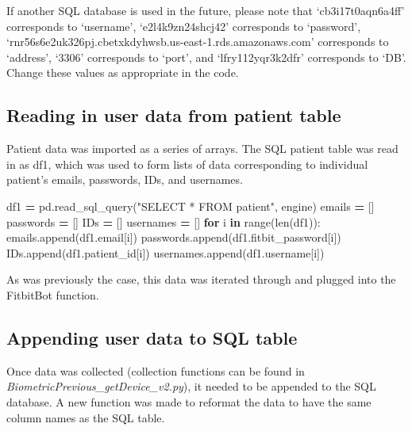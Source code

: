 \documentclass[]{book}
\newenvironment{Shaded}{\begin{snugshade}}{\end{snugshade}}
\newcommand{\BuiltInTok}[1]{#1}
\newcommand{\ControlFlowTok}[1]{\textcolor[rgb]{0.13,0.29,0.53}{\textbf{#1}}}
\newcommand{\KeywordTok}[1]{\textcolor[rgb]{0.13,0.29,0.53}{\textbf{#1}}}
\newcommand{\NormalTok}[1]{#1}
\newcommand{\OperatorTok}[1]{\textcolor[rgb]{0.81,0.36,0.00}{\textbf{#1}}}
\newcommand{\StringTok}[1]{\textcolor[rgb]{0.31,0.60,0.02}{#1}}
\begin{document}
If another SQL database is used in the future, please note that `cb3i17t0aqn6a4ff' corresponds to `username', `e2l4k9zn24shcj42' corresponds to `password', `rnr56s6e2uk326pj.cbetxkdyhwsb.us-east-1.rds.amazonaws.com' corresponds to `address', `3306' corresponds to `port', and `lfry112yqr3k2dfr' corresponds to `DB'. Change these values as appropriate in the code.

\hypertarget{reading-in-user-data-from-patient-table}{%
\subsection{Reading in user data from patient table}\label{reading-in-user-data-from-patient-table}}

Patient data was imported as a series of arrays. The SQL patient table was read in as df1, which was used to form lists of data corresponding to individual patient's emails, passwords, IDs, and usernames.

\begin{Shaded}
\begin{Highlighting}[]
\NormalTok{df1 }\OperatorTok{=}\NormalTok{ pd.read_sql_query(}\StringTok{"SELECT * FROM patient"}\NormalTok{, engine)}
\NormalTok{emails }\OperatorTok{=}\NormalTok{ []}
\NormalTok{passwords }\OperatorTok{=}\NormalTok{ []}
\NormalTok{IDs }\OperatorTok{=}\NormalTok{ []}
\NormalTok{usernames }\OperatorTok{=}\NormalTok{ []}
\ControlFlowTok{for}\NormalTok{ i }\KeywordTok{in} \BuiltInTok{range}\NormalTok{(}\BuiltInTok{len}\NormalTok{(df1)):}
\NormalTok{    emails.append(df1.email[i])}
\NormalTok{    passwords.append(df1.fitbit_password[i])}
\NormalTok{    IDs.append(df1.patient_id[i])}
\NormalTok{    usernames.append(df1.username[i])}
\end{Highlighting}
\end{Shaded}

As was previously the case, this data was iterated through and plugged into the FitbitBot function.

\hypertarget{appending-user-data-to-sql-table}{%
\subsection{Appending user data to SQL table}\label{appending-user-data-to-sql-table}}

Once data was collected (collection functions can be found in \emph{BiometricPrevious\_getDevice\_v2.py}), it needed to be appended to the SQL database. A new function was made to reformat the data to have the same column names as the SQL table.
\end{document}
